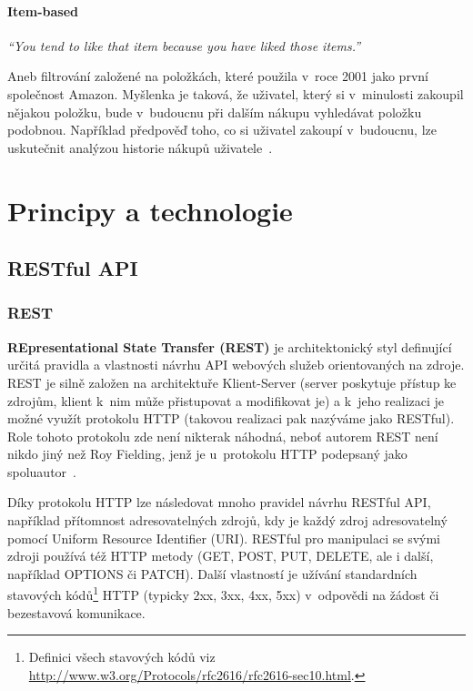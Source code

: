 \documentclass[thesis=M,czech]{FITthesis}[2014/05/07]
\begin{document}
\paragraph{Item-based}

\emph{``You tend to like that item because you have liked those items.''}~\cite{cf}

Aneb filtrování založené na položkách, které použila v~roce 2001 jako první společnost Amazon. Myšlenka je taková, že uživatel, který si v~minulosti zakoupil nějakou položku, bude v~budoucnu při dalším nákupu vyhledávat položku podobnou. Například předpověď toho, co si uživatel zakoupí v~budoucnu, lze uskutečnit analýzou historie nákupů uživatele~\cite{itemcf}. 

\section{Principy a technologie}
\label{sec:sysanalys}

\subsection{RESTful API}
\label{rest}
\subsubsection{REST}
\textbf{REpresentational State Transfer (REST)} je architektonický styl definující určitá pravidla a vlastnosti návrhu API webových služeb orientovaných na zdroje. REST je silně založen na architektuře Klient-Server (server poskytuje přístup ke zdrojům, klient k~nim může přistupovat a modifikovat je) a k~jeho realizaci je možné využít protokolu HTTP (takovou realizaci pak nazýváme jako RESTful). Role tohoto protokolu zde není nikterak náhodná, neboť autorem REST není nikdo jiný než Roy Fielding, jenž je u~protokolu HTTP podepsaný jako spoluautor~\cite{Fielding:2000:ASD:932295}. 

Díky protokolu HTTP lze následovat mnoho pravidel návrhu RESTful API, například přítomnost adresovatelných zdrojů, kdy je každý zdroj adresovatelný pomocí Uniform Resource Identifier (URI). RESTful pro manipulaci se svými zdroji používá též HTTP metody (GET, POST, PUT, DELETE, ale i další, například OPTIONS či PATCH). Další vlastností je užívání standardních stavových kódů\footnote{Definici všech stavových kódů viz \url{http://www.w3.org/Protocols/rfc2616/rfc2616-sec10.html}.} HTTP (typicky 2xx, 3xx, 4xx, 5xx) v~odpovědi na žádost či bezestavová komunikace.
\end{document}
